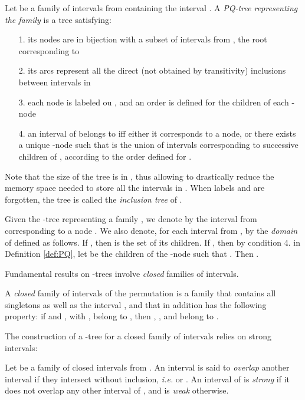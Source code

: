 \documentclass{article}
\begin{document}
\begin{definition} Let  be a family of intervals from  containing the interval . 
A {\em PQ-tree representing the family } is a tree  satisfying:

\begin{itemize}
\item[1.] its nodes are in bijection with a subset  of intervals from , the root corresponding to 
\item[2.] its arcs represent all the direct (not obtained by transitivity) inclusions between intervals in 
\item[3.] each node is labeled  ou , and an order is defined for the children of each -node
\item[4.] an interval  of  belongs to  iff either it corresponds to a node, or there
exists a unique -node  such that   is the union of intervals corresponding to
successive children of , according to the order defined for .
\end{itemize}
\label{def:PQ}
\end{definition}

Note that the size of the tree is in , thus allowing to drastically reduce the memory
space needed to store all the intervals in . When labels  and  are forgotten, the tree  
is called the {\em inclusion tree} of .

Given the -tree representing a family , we denote by  the interval from  corresponding
to a node . We also denote, for each interval  from , by  the {\it domain} of  defined 
as follows. If , then  is the set of its children. If , then by condition
4. in Definition \ref{def:PQ}, let  be the children of the -node  such
that . Then .

Fundamental results on -trees involve {\it closed} families of intervals.

\begin{definition}
A {\em closed} family  of intervals of the permutation  is a family that contains all singletons as well  
as the interval , and that in addition has the following property:  
if  and , with , belong to , then  
, ,   and  belong to .
\end{definition}

The construction of a -tree for a closed family of intervals relies on strong
intervals:

\begin{definition}
Let  be a family of closed intervals from . An interval  is said to \emph{overlap} another interval 
 if they intersect without inclusion,  \emph{i.e.}  or . 
An interval  of  is {\em strong} if it does not overlap any other  interval of , 
and  is {\em weak} otherwise.
\label{def:strong}
\end{definition}
\end{document}
